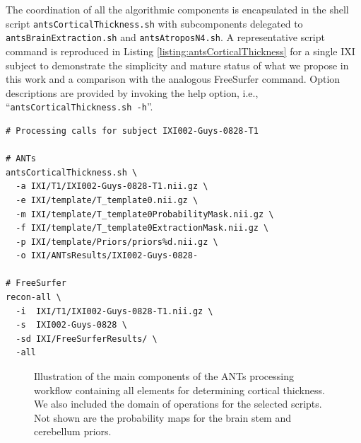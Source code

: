 The coordination of all the algorithmic components is
encapsulated in the shell script {\tt antsCorticalThickness.sh} with
subcomponents delegated to {\tt antsBrainExtraction.sh} 
and {\tt antsAtroposN4.sh}.  A representative script command 
is reproduced in Listing \ref{listing:antsCorticalThickness} for
a single IXI subject to demonstrate the simplicity and
mature status of what we propose in this work and a comparison
with the analogous FreeSurfer command.  
Option descriptions are provided by invoking the
help option, i.e., ``{\tt antsCorticalThickness.sh -h}''.

\begin{lstlisting}
# Processing calls for subject IXI002-Guys-0828-T1

# ANTs
antsCorticalThickness.sh \
  -a IXI/T1/IXI002-Guys-0828-T1.nii.gz \
  -e IXI/template/T_template0.nii.gz \
  -m IXI/template/T_template0ProbabilityMask.nii.gz \
  -f IXI/template/T_template0ExtractionMask.nii.gz \  
  -p IXI/template/Priors/priors%d.nii.gz \
  -o IXI/ANTsResults/IXI002-Guys-0828-

# FreeSurfer  
recon-all \
  -i  IXI/T1/IXI002-Guys-0828-T1.nii.gz \
  -s  IXI002-Guys-0828 \
  -sd IXI/FreeSurferResults/ \
  -all
\end{lstlisting}

\begin{figure}
  \centering
  \caption{Illustration of the main components of the ANTs processing 
  workflow containing all elements for determining cortical thickness. 
  We also included the domain of operations for the selected scripts.
  Not shown are the probability maps for the brain stem and cerebellum
  priors.}
  \label{fig:pipeline}
\end{figure}


